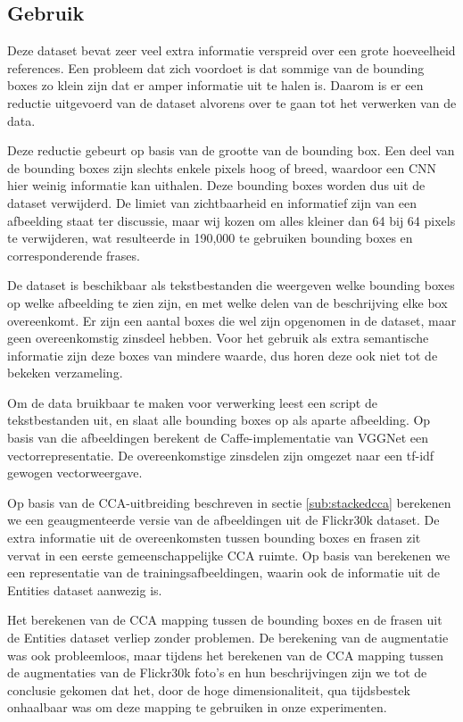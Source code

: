 \subsection{Gebruik}
\label{sub:Gebruik}
Deze dataset bevat zeer veel extra informatie verspreid over een grote hoeveelheid references. Een probleem dat zich voordoet is dat sommige van de bounding boxes zo klein zijn dat er amper informatie uit te halen is. Daarom is er een reductie uitgevoerd van de dataset alvorens over te gaan tot het verwerken van de data. 

Deze reductie gebeurt op basis van de grootte van de bounding box. Een deel van de bounding boxes zijn slechts enkele pixels hoog of breed, waardoor een CNN hier weinig informatie kan uithalen. Deze bounding boxes worden dus uit de dataset verwijderd. De limiet van zichtbaarheid en informatief zijn van een afbeelding staat ter discussie, maar wij kozen om alles kleiner dan 64 bij 64 pixels te verwijderen, wat resulteerde in 190,000 te gebruiken bounding boxes en corresponderende frases. 

De dataset is beschikbaar als tekstbestanden die weergeven welke bounding boxes op welke afbeelding te zien zijn, en met welke delen van de beschrijving elke box overeenkomt. Er zijn een aantal boxes die wel zijn opgenomen in de dataset, maar geen overeenkomstig zinsdeel hebben. Voor het gebruik als extra semantische informatie zijn deze boxes van mindere waarde, dus horen deze ook niet tot de bekeken verzameling. 

Om de data bruikbaar te maken voor verwerking leest een script de tekstbestanden uit, en slaat alle bounding boxes op als aparte afbeelding. Op basis van die afbeeldingen berekent de Caffe-implementatie van VGGNet een vectorrepresentatie. De overeenkomstige zinsdelen zijn omgezet naar een tf-idf gewogen vectorweergave. 

Op basis van de CCA-uitbreiding beschreven in sectie \ref{sub:stackedcca} berekenen we een geaugmenteerde versie van de afbeeldingen uit de Flickr30k dataset. De extra informatie uit de overeenkomsten tussen bounding boxes en frasen zit vervat in een eerste gemeenschappelijke CCA ruimte. Op basis van  berekenen we een representatie van de trainingsafbeeldingen, waarin ook de informatie uit de Entities dataset aanwezig is.



Het berekenen van de CCA mapping tussen de bounding boxes en de frasen uit de Entities dataset verliep zonder problemen. De berekening van de augmentatie was ook probleemloos, maar tijdens het berekenen van de CCA mapping tussen de augmentaties van de Flickr30k foto's en hun beschrijvingen zijn we tot de conclusie gekomen dat het, door de hoge dimensionaliteit, qua tijdsbestek onhaalbaar was om deze mapping te gebruiken in onze experimenten. 



